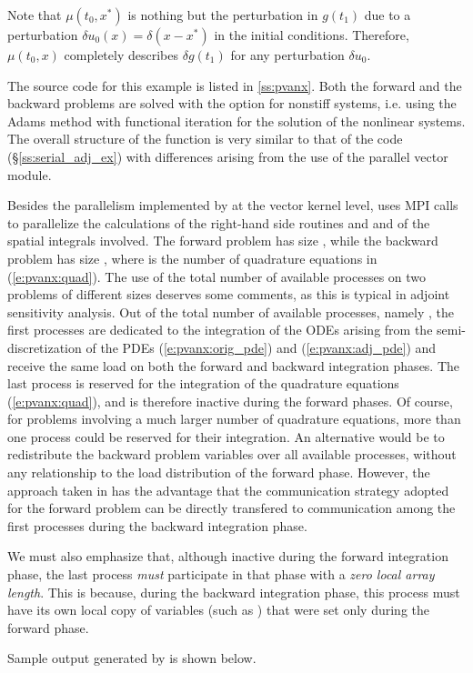 Note that $\mu(t_0 , x^*)$ is nothing but the perturbation in $g(t_1)$
due to a perturbation $\delta u_0(x) = \delta(x-x^*)$ in the initial conditions.
Therefore, $\mu(t_0,x)$ completely describes $\delta g(t_1)$ for any
perturbation $\delta u_0$.

The source code for this example is listed in \A\ref{ss:pvanx}. Both the forward
and the backward problems are solved with the option for nonstiff systems,
i.e. using the Adams method with functional iteration for the solution of
the nonlinear systems. The overall structure of the  function is very
similar to that of the code  (\S\ref{ss:serial_adj_ex}) with 
differences arising from the use of the parallel vector module.

Besides the parallelism implemented by {\cvodes} at the vector kernel level,
 uses MPI calls to parallelize the calculations of the right-hand side
routines  and  and of the spatial integrals involved.
The forward problem has size , while the backward problem has
size , where  is the number of quadrature equations
in (\ref{e:pvanx:quad}).
The use of the total number of available processes on two problems of different 
sizes deserves some comments, as this is typical in adjoint sensitivity 
analysis. Out of the total number of available processes, namely ,
the first  processes are dedicated to the integration of
the ODEs arising from the semi-discretization of the PDEs 
(\ref{e:pvanx:orig_pde}) and (\ref{e:pvanx:adj_pde}) and receive
the same load on both the forward and backward integration phases. 
The last process is reserved for the integration of the quadrature equations 
(\ref{e:pvanx:quad}), and is therefore inactive during the forward phases.
Of course, for problems involving a much larger number of quadrature equations,
more than one process could be reserved for their integration. 
An alternative would be to redistribute the  backward problem variables 
over all available processes, without any relationship to the load distribution 
of the forward phase. However, the approach taken in  has the 
advantage that the communication strategy adopted for the forward problem 
can be directly transfered to communication among the first 
processes during the backward integration phase. 

We must also emphasize that, although inactive during the forward integration phase, 
the last process {\em must} participate in that phase with a 
{\em zero local array length}. 
This is because, during the backward integration phase, this process must
have its own local copy of variables (such as ) that were set
only during the forward phase.

Sample output generated by  is shown below.
{\small}
